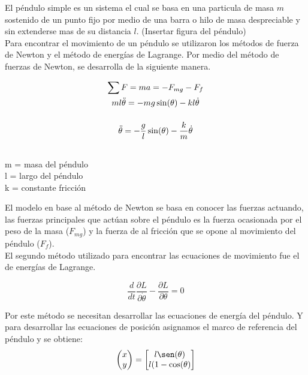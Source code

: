 El péndulo simple es un sistema el cual se basa en una particula de masa $m$ sostenido de un punto fijo por medio de una barra o hilo de masa despreciable y sin extenderse mas de su distancia $l$. (Insertar figura del péndulo)\\

Para encontrar el movimiento de un péndulo se utilizaron los métodos de fuerza de Newton y el método de energías de Lagrange. Por medio del método de fuerzas de Newton, se desarrolla de la siguiente manera.
\begin{large}
\begin{gather*}
\sum F = ma = -F_{mg} - F_f \\ \bigskip
ml\ddot{\theta} = -mg\sin(\theta) - kl\dot{\theta} \\ \bigskip
\ddot{\theta} = -\dfrac{g}{l}\sin(\theta) - \dfrac{k}{m}\dot{\theta} \\
\end{gather*} 
\end{large}
\begin{flushright}
\begin{small}
m = masa del péndulo\\
l = largo del péndulo\\
k = constante fricción\\
\end{small}
\end{flushright}

El modelo en base al método de Newton se basa en conocer las fuerzas actuando, las fuerzas principales que actúan sobre el péndulo es la fuerza ocasionada por el peso de la masa ($F_{mg}$) y la fuerza de al fricción que se opone al movimiento del péndulo ($F_f$).\\

El segundo método utilizado para encontrar las ecuaciones de movimiento fue el de energías de Lagrange.
\begin{large}
\begin{equation} \label{L_equ}
\dfrac{d}{dt} \dfrac{\partial L}{\partial \dot{\theta}} - \dfrac{\partial L}{\partial\theta} = 0
\end{equation}
\end{large}
Por este método se necesitan desarrollar las ecuaciones de energía del péndulo. Y para desarrollar las ecuaciones de posición asignamos el marco de referencia del péndulo y se obtiene:\\
\begin{equation}
\left(\begin{matrix}
x\\
y
\end{matrix}\right) = 
\begin{bmatrix}
l\sen(\theta)\\
l(1 - \cos(\theta)
\end{bmatrix}
\end{equation}

